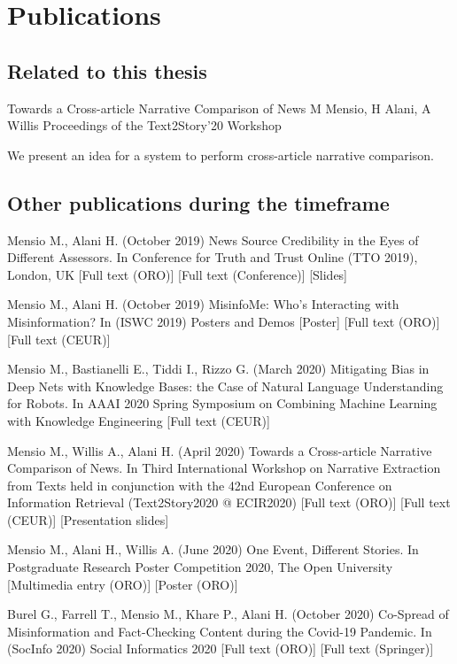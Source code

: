 \section{Publications}
\label{sec:intro_publications}

\subsection{Related to this thesis}

Towards a Cross-article Narrative Comparison of News
M Mensio, H Alani, A Willis
Proceedings of the Text2Story’20 Workshop

We present an idea for a system to perform cross-article narrative comparison.

\subsection{Other publications during the timeframe}

Mensio M., Alani H. (October 2019) News Source Credibility in the Eyes of Different Assessors. In Conference for Truth and Trust Online (TTO 2019), London, UK [Full text (ORO)] [Full text (Conference)] [Slides]

Mensio M., Alani H. (October 2019) MisinfoMe: Who’s Interacting with Misinformation? In (ISWC 2019) Posters and Demos [Poster] [Full text (ORO)] [Full text (CEUR)]


Mensio M., Bastianelli E., Tiddi I., Rizzo G. (March 2020) Mitigating Bias in Deep Nets with Knowledge Bases: the Case of Natural Language Understanding for Robots. In AAAI 2020 Spring Symposium on Combining Machine Learning with Knowledge Engineering [Full text (CEUR)]

Mensio M., Willis A., Alani H. (April 2020) Towards a Cross-article Narrative Comparison of News. In Third International Workshop on Narrative Extraction from Texts held in conjunction with the 42nd European Conference on Information Retrieval (Text2Story2020 @ ECIR2020) [Full text (ORO)] [Full text (CEUR)] [Presentation slides]

Mensio M., Alani H., Willis A. (June 2020) One Event, Different Stories. In Postgraduate Research Poster Competition 2020, The Open University [Multimedia entry (ORO)] [Poster (ORO)]

Burel G., Farrell T., Mensio M., Khare P., Alani H. (October 2020) Co-Spread of Misinformation and Fact-Checking Content during the Covid-19 Pandemic. In (SocInfo 2020) Social Informatics 2020 [Full text (ORO)] [Full text (Springer)]

